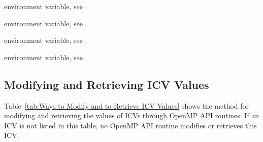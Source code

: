 \begin{crossrefs}
\item {} environment variable, see .

\item {} environment variable, see .

\item {} environment variable, see .

\item {} environment variable, see .
\end{crossrefs}



\subsection{Modifying and Retrieving ICV Values}
\label{subsec:Modifying and Retrieving ICV Values}
Table~\ref{tab:Ways to Modify and to Retrieve ICV Values} shows the method 
for modifying and retrieving the values of ICVs through OpenMP API routines.
If an ICV is not listed in this table, no OpenMP API routine modifies or 
retrieves this ICV.

